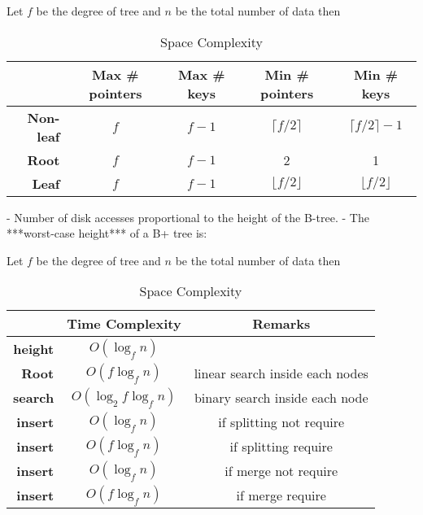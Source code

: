 \documentclass[paper=letter, fontsize=12pt]{article}
\begin{document}
\begin{table}[H]
	Let $f$ be the degree of tree and $n$ be the total number of data then
	\centering
	\caption*{Space Complexity}
	\begin{tabular}{r | c | c | c | c}
		& \textbf{Max \# pointers} & \textbf{Max \# keys} & \textbf{Min \# pointers} & \textbf{Min \# keys} \\
		\hline
		\hline
		\textbf{Non-leaf} & $f$ & $f - 1$ & $\lceil f/2 \rceil$ & $\lceil f/2 \rceil - 1$ \\
		\textbf{Root} & $f$ & $f - 1$ & 2 & 1 \\
		\textbf{Leaf} & $f$ & $f - 1$ & $\lfloor f/2 \rfloor$ & $\lfloor f/2 \rfloor$ \\
	\end{tabular}
\end{table}


- Number of disk accesses proportional to the height of the B-tree.
- The ***worst-case height*** of a B+ tree is:

\begin{table}[H]
	Let $f$ be the degree of tree and $n$ be the total number of data then
	\centering
	\caption*{Space Complexity}
	\begin{tabular}{r | c | c }
		& \textbf{Time Complexity} & \textbf{Remarks} \\
		\hline
		\hline
		\textbf{height} & $O(\log_fn)$ & \\
		\textbf{Root} & $O(f\log_fn)$ & linear search inside each nodes \\
		\textbf{search} & $O(\log_2f\log_fn)$  & binary search inside each node \\
		\textbf{insert} & $O(\log_fn)$ & if splitting not require \\
		\textbf{insert} & $O(f\log_fn)$  & if splitting require \\
		\textbf{insert} &  $O(\log_fn)$  & if merge not require  \\
		\textbf{insert} &  $O(f\log_fn)$  & if merge require \\
	\end{tabular}
\end{table}

%
%
\end{document}
